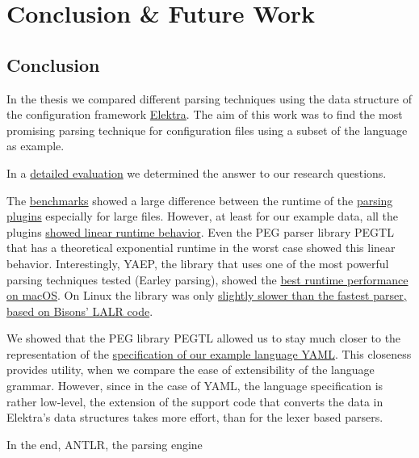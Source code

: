 \chapter{Conclusion \& Future Work}
\label{sec:conclusion_and_future_work}

\section{Conclusion}

In the thesis we compared different parsing techniques using the  data structure of the configuration framework \href{https://www.libelektra.org}{Elektra}. The aim of this work was to find the most promising parsing technique for configuration files using a subset of the language  as example.

In a \hyperref[sec:evaluation]{detailed evaluation} we determined the answer to our research questions.

\speed*

The \hyperref[sec:run_time_performance]{benchmarks} showed a large difference between the runtime of the \hyperref[sec:design_challenges_and_decisions]{parsing plugins} especially for large files. However, at least for our example data, all the plugins \hyperref[fig:benchmark_results_generated_above_1000]{showed linear runtime behavior}. Even the PEG parser library \gls{PEGTL} that has a theoretical exponential runtime in the worst case showed this linear behavior. Interestingly, \gls{YAEP}, the library that uses one of the most powerful parsing techniques tested (Earley parsing), showed the \hyperref[fig:benchmark_generated]{best runtime performance on macOS}. On Linux the library was only \hyperref[fig:benchmark_generated]{slightly slower than the fastest parser, based on Bisons’ LALR code}.

\closeness*

We showed that the \gls{PEG} library \gls{PEGTL} allowed us to stay much closer to the representation of the \href{http://yaml.org/spec/1.2/spec.html}{specification of our example language YAML}. This closeness provides utility, when we compare the ease of extensibility of the language grammar. However, since in the case of YAML, the language specification is rather low-level, the extension of the support code that converts the data in Elektra’s data structures takes more effort, than for the lexer based parsers.

In the end, \gls{ANTLR}, the parsing engine

